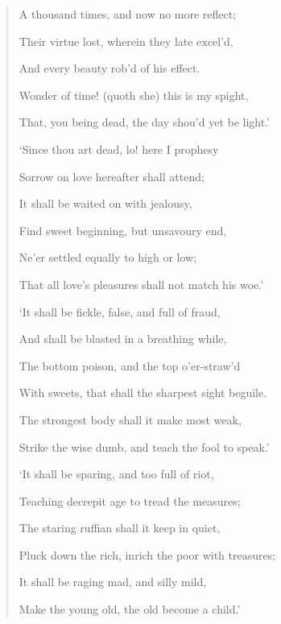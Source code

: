 \documentclass[a4paper, 11pt, oneside, polutonikogreek, english]{article}
\begin{document}
\begin{quotation}
A thousand times, and now no more reflect;

Their virtue lost, wherein they late excel'd,

And every beauty rob'd of his effect.

\hspace*{15mm}Wonder of time! (quoth she) this is my spight,

\hspace*{15mm}That, you being dead, the day shou'd yet be light.'

\bigskip

`Since thou art dead, lo! here I prophesy

Sorrow on love hereafter shall attend;

It shall be waited on with jealousy,

Find sweet beginning, but unsavoury end,

\hspace*{15mm}Ne'er settled equally to high or low;

\hspace*{15mm}That all love's pleasures shall not match his woe.'

\bigskip

`It shall be fickle, false, and full of fraud,

And shall be blasted in a breathing while,

The bottom poison, and the top o'er-straw'd

With sweets, that shall the sharpest sight beguile.

\hspace*{15mm}The strongest body shall it make most weak,

\hspace*{15mm}Strike the wise dumb, and teach the fool to speak.'

\bigskip

`It shall be sparing, and too full of riot,

Teaching decrepit age to tread the measures;

The staring ruffian shall it keep in quiet,

Pluck down the rich, inrich the poor with treasures;

\hspace*{15mm}It shall be raging mad, and silly mild,

\hspace*{15mm}Make the young old, the old become a child.'

\bigskip


\end{quotation}
\end{document}
